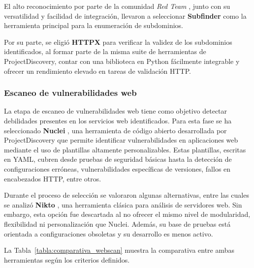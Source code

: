 \begin{parskipenv}
El alto reconocimiento por parte de la comunidad \textit{Red Team} \cite{redteam}, junto con su versatilidad y facilidad de integración, llevaron a seleccionar \textbf{Subfinder} como la herramienta principal para la enumeración de subdominios. 

Por su parte, se eligió \textbf{HTTPX} para verificar la validez de los subdominios identificados, al formar parte de la misma suite de herramientas de ProjectDiscovery, contar con una biblioteca en Python fácilmente integrable y ofrecer un rendimiento elevado en tareas de validación HTTP.

\subsubsection*{Escaneo de vulnerabilidades web}
La etapa de escaneo de vulnerabilidades web tiene como objetivo detectar debilidades presentes en los servicios web identificados. Para esta fase se ha seleccionado \textbf{Nuclei} \cite{nuclei}, una herramienta de código abierto desarrollada por ProjectDiscovery que permite identificar vulnerabilidades en aplicaciones web mediante el uso de plantillas altamente personalizables. Estas plantillas, escritas en YAML, cubren desde pruebas de seguridad básicas hasta la detección de configuraciones erróneas, vulnerabilidades específicas de versiones, fallos en encabezados HTTP, entre otros.

Durante el proceso de selección se valoraron algunas alternativas, entre las cuales se analizó \textbf{Nikto} \cite{nikto}, una herramienta clásica para análisis de servidores web. Sin embargo, esta opción fue descartada al no ofrecer el mismo nivel de modularidad, flexibilidad ni personalización que Nuclei. Además, su base de pruebas está orientada a configuraciones obsoletas y su desarrollo es menos activo.

La Tabla~\ref{tabla:comparativa_webscan} muestra la comparativa entre ambas herramientas según los criterios definidos.

\begin{table}[H]
\centering
\renewcommand{\arraystretch}{1.4}
\caption{Comparativa de herramientas para escaneo de vulnerabilidades web.}
\label{tabla:comparativa_webscan}
\end{table}


\end{parskipenv}
